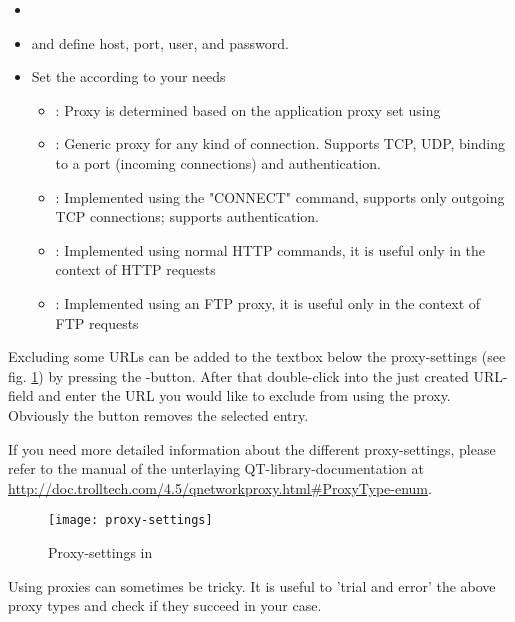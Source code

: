 \begin{itemize}
\item {}
\item {} and define host, port, user, and password.
\item Set the  according to your needs
 \begin{itemize}
  \item {}: Proxy is determined based on the application proxy set using
  \item {}: Generic proxy for any kind of connection. Supports TCP, UDP, binding to a port (incoming connections) and authentication.
  \item {}: Implemented using the "CONNECT" command, supports only outgoing TCP connections; supports authentication.
  \item {}: Implemented using normal HTTP commands, it is useful only in the context of HTTP requests
  \item {}: Implemented using an FTP proxy, it is useful only in the context of FTP requests
 \end{itemize}
\end{itemize}

Excluding some URLs can be added to the textbox below the proxy-settings (see
fig. \ref{fig:proxy-settings}) by pressing the -button. After that
double-click into the just created URL-field and enter the URL you would like
to exclude from using the proxy. Obviously the button  removes the selected
entry.

If you need more detailed information about the different proxy-settings,
please refer to the manual of the unterlaying QT-library-documentation at
\url{http://doc.trolltech.com/4.5/qnetworkproxy.html#ProxyType-enum}.

\begin{figure}[ht]
   \centering
   \texttt{[image: proxy-settings]}
   \caption{Proxy-settings in \qg \nixcaption}
   \label{fig:proxy-settings}
\end{figure}

\begin{Tip} \caption{\textsc{Using Proxies}}
Using proxies can sometimes be tricky. It is useful to 'trial and
error' the above proxy types and check if they succeed in your case.
\end{Tip}

